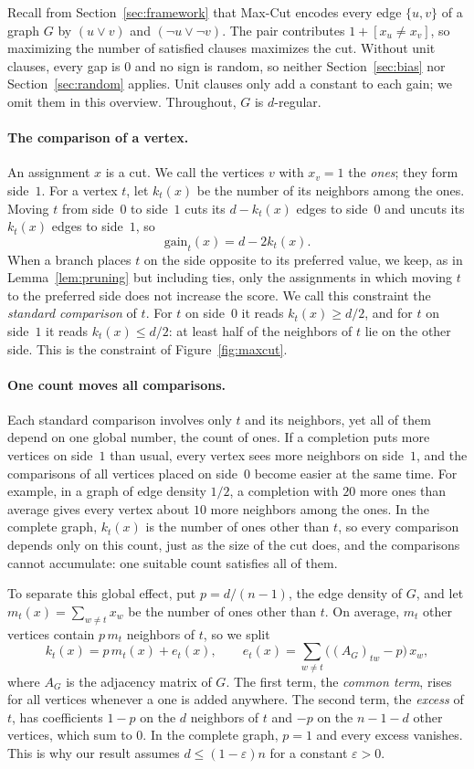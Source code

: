 \documentclass[11pt,a4paper]{article}
\theoremstyle{definition}
\theoremstyle{remark}
\begin{document}
Recall from Section~\ref{sec:framework} that Max-Cut encodes every edge
$\{u,v\}$ of a graph $G$ by $(u\vee v)$ and $(\neg u\vee\neg v)$. The pair
contributes $1+[x_u\ne x_v]$, so maximizing the number of satisfied
clauses maximizes the cut. Without unit clauses, every gap is $0$ and no
sign is random, so neither Section~\ref{sec:bias} nor
Section~\ref{sec:random} applies. Unit clauses only add a constant to each
gain; we omit them in this overview. Throughout, $G$ is $d$-regular.

\paragraph{The comparison of a vertex.}
An assignment $x$ is a cut. We call the vertices $v$ with $x_v=1$ the
\emph{ones}; they form side~$1$. For a vertex $t$, let $k_t(x)$ be the
number of its neighbors among the ones. Moving $t$ from side~$0$ to
side~$1$ cuts its $d-k_t(x)$ edges to side~$0$ and uncuts its $k_t(x)$
edges to side~$1$, so
\[
 \mathrm{gain}_t(x)=d-2k_t(x).
\]
When a branch places $t$ on the side opposite to its preferred value, we
keep, as in Lemma~\ref{lem:pruning} but including ties, only the
assignments in which moving $t$ to the preferred side does not increase
the score. We call this constraint the \emph{standard comparison} of $t$.
For $t$ on side~$0$ it reads $k_t(x)\ge d/2$, and for $t$ on side~$1$ it
reads $k_t(x)\le d/2$: at least half of the neighbors of $t$ lie on the
other side. This is the constraint of Figure~\ref{fig:maxcut}.

\paragraph{One count moves all comparisons.}
Each standard comparison involves only $t$ and its neighbors, yet all of
them depend on one global number, the count of ones. If a completion puts
more vertices on side~$1$ than usual, every vertex sees more neighbors on
side~$1$, and the comparisons of all vertices placed on side~$0$ become
easier at the same time. For example, in a graph of edge density $1/2$, a
completion with $20$ more ones than average gives every vertex about $10$
more neighbors among the ones. In the complete graph, $k_t(x)$ is the
number of ones other than $t$, so every comparison depends only on this
count, just as the size of the cut does, and the comparisons cannot
accumulate: one suitable count satisfies all of them.

To separate this global effect, put $p=d/(n-1)$, the edge density of $G$,
and let $m_t(x)=\sum_{w\ne t}x_w$ be the number of ones other than $t$. On
average, $m_t$ other vertices contain $p\,m_t$ neighbors of $t$, so we split
\[
 k_t(x)=p\,m_t(x)+e_t(x),\qquad
 e_t(x)=\sum_{w\ne t}\bigl((A_G)_{tw}-p\bigr)\,x_w,
\]
where $A_G$ is the adjacency matrix of $G$. The first term, the
\emph{common term}, rises for all vertices whenever a one is added
anywhere. The second term, the \emph{excess} of $t$, has coefficients
$1-p$ on the $d$ neighbors of $t$ and $-p$ on the $n-1-d$ other vertices,
which sum to $0$. In the complete graph, $p=1$ and every excess vanishes.
This is why our result assumes $d\le(1-\varepsilon)n$ for a constant
$\varepsilon>0$.
\end{document}
